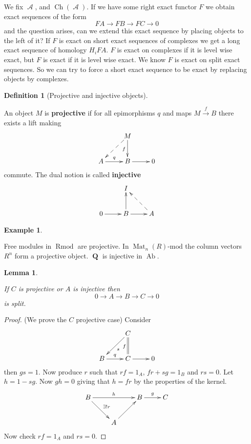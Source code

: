 \documentclass[10pt,]{book}
\newcommand{\terminology}[1]{\textbf{#1}}
\theoremstyle{plain}
\newtheorem{lemma}[theorem]{Lemma}
\theoremstyle{definition}
\newtheorem{definition}[theorem]{Definition}
\newtheorem{example}[theorem]{Example}
\numberwithin{equation}{section}
\DeclareMathOperator{\Ch}{Ch}
\DeclareMathOperator{\Ab}{\text{Ab}}
\DeclareMathOperator{\Rmod}{R\text{mod}}
\DeclareMathOperator{\cA}{\mathcal{A}}
\DeclareMathOperator{\Mat}{Mat}
\DeclareMathOperator{\QQ}{\mathbf{Q}}
\begin{document}
          We fix \(\cA\), and \(\Ch(\cA)\).
          If we have some right exact functor \(F\) we obtain exact sequences of the form
          \[FA \to FB \to FC \to 0\]
          and the question arises, can we extend this exact sequence by placing objects to the left of it?\newline{}
          If \(F\) is exact on short exact sequences of complexes we get a long exact sequence of homology \(H_iFA\).
          \(F\) is exact on complexes if it is level wise exact, but \(F\) is exact if it is level wise exact.
          We know \(F\) is exact on split exact sequences.
          So we can try to force a short exact sequence to be exact by replacing objects by complexes.
\begin{definition}[Projective and injective objects]\label{definition-17}

            An object \(M\) is \terminology{projective} if for all epimorphisms \(q\) and maps \(M \xrightarrow{f} B\) there exists a lift making
            \[
              \xymatrix{ & M \ar[d]_f \ar@{-->}[dl]&\\
              A \ar[r]^q &B \ar[r] & 0}
            \]
            commute.
            The dual notion is called \terminology{injective}\[
              \xymatrix{ & I&\\
              0 \ar[r] &B \ar[u] \ar[r] & A  \ar@{-->}[ul]}
            \]\end{definition}
\begin{example}\label{example-9}

            Free modules in \(\Rmod\) are projective.
            In \(\Mat_n(R)\text{-mod}\) the column vectors \(R^n\) form a projective object.
            \(\QQ\) is injective in \(\Ab\).
          \end{example}
\begin{lemma}\label{lemma-proj-inj-split}

            If \(C\) is projective or \(A\) is injective then
            \[
              0 \to A \to B \to C \to 0
            \]
            is split.
          \end{lemma}
\begin{proof}

            (We prove the \(C\) projective case) Consider 
            \[
              \xymatrix{ & C \ar@{=}[d]_f \ar[dl]^s&\\
              B \ar[r]^q &C \ar[r] & 0}
            \]
            then \(gs = 1\).
            Now produce \(r\) such that \(rf = 1_A\), \(fr + sg = 1_B\) and \(rs = 0\).
            Let \(h  = 1 -sg\).
            Now \(gh = 0\) giving that \(h = fr\) by the properties of the kernel.
            \[
              \xymatrix{B \ar[rr]^h\ar[rd]^{\exists ! r} &&B \ar[r]^g &C \\ & A \ar[ur] &}
            \]
            Now check \(rf = 1_A\) and \(rs = 0\).
          \end{proof}
\par
\end{document}
